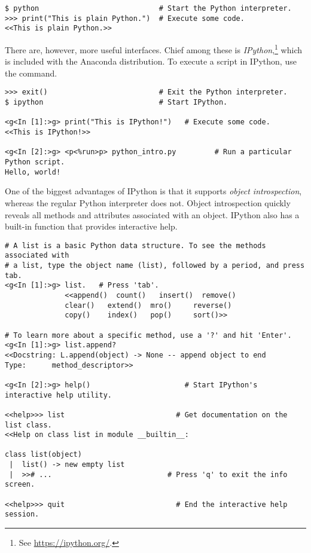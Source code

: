 \begin{lstlisting}
$ python                            # Start the Python interpreter.
>>> print("This is plain Python.")  # Execute some code.
<<This is plain Python.>>
\end{lstlisting}

There are, however, more useful interfaces.
Chief among these is \emph{IPython},\footnote{See \url{https://ipython.org/}.} which is included with the Anaconda distribution.
To execute a script in IPython, use the  command.

\begin{lstlisting}
>>> exit()                          # Exit the Python interpreter.
$ ipython                           # Start IPython.

<g<In [1]:>g> print("This is IPython!")   # Execute some code.
<<This is IPython!>>

<g<In [2]:>g> <p<%run>p> python_intro.py         # Run a particular Python script.
Hello, world!
\end{lstlisting}

One of the biggest advantages of IPython is that it supports \emph{object introspection}, whereas the regular Python interpreter does not.
Object introspection quickly reveals all methods and attributes associated with an object.
IPython also has a built-in  function that provides interactive help.

\begin{lstlisting}
# A list is a basic Python data structure. To see the methods associated with
# a list, type the object name (list), followed by a period, and press tab.
<g<In [1]:>g> list.   # Press 'tab'.
              <<append()  count()   insert()  remove()
              clear()   extend()  mro()     reverse()
              copy()    index()   pop()     sort()>>

# To learn more about a specific method, use a '?' and hit 'Enter'.
<g<In [1]:>g> list.append?
<<Docstring: L.append(object) -> None -- append object to end
Type:      method_descriptor>>

<g<In [2]:>g> help()                      # Start IPython's interactive help utility.

<<help>>> list                          # Get documentation on the list class.
<<Help on class list in module __builtin__:

class list(object)
 |  list() -> new empty list
 |  >># ...                           # Press 'q' to exit the info screen.

<<help>>> quit                          # End the interactive help session.
\end{lstlisting}

